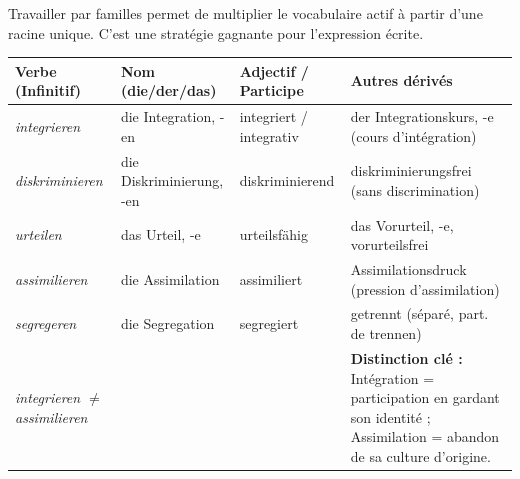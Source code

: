 \documentclass[11pt]{article}
\newcommand{\cle}[1]{{\popxbold\color{popdark}#1}}
\newcommand{\all}[1]{\ifmmode\text{\textit{#1}}\else\begingroup\selectlanguage{ngerman}\itshape #1\endgroup\fi}
\begin{document}
Travailler par familles permet de multiplier le vocabulaire actif à partir d'une racine unique. C'est une stratégie gagnante pour l'expression écrite.

\begin{center}
\begin{tabularx}{\linewidth}{|X|X|X|X|}
\hline
\rowcolor{popgoldL}
\textbf{Verbe (Infinitif)} & \textbf{Nom (die/der/das)} & \textbf{Adjectif / Participe} & \textbf{Autres dérivés} \\
\hline
\all{integrieren} & \cle{die Integration, -en} & \cle{integriert} / \cle{integrativ} & \cle{der Integrationskurs, -e} (cours d'intégration) \\
\all{diskriminieren} & \cle{die Diskriminierung, -en} & \cle{diskriminierend} & \cle{diskriminierungsfrei} (sans discrimination) \\
\all{urteilen} & \cle{das Urteil, -e} & \cle{urteilsfähig} & \cle{das Vorurteil, -e}, \cle{vorurteilsfrei} \\
\all{assimilieren} & \cle{die Assimilation} & \cle{assimiliert} & \cle{Assimilationsdruck} (pression d'assimilation) \\
\all{segregeren} & \cle{die Segregation} & \cle{segregiert} & \cle{getrennt} (séparé, part. de \cle{trennen}) \\
\all{integrieren} $\neq$ \all{assimilieren} & & & \textbf{Distinction clé :} Intégration = participation en gardant son identité ; Assimilation = abandon de sa culture d'origine. \\
\hline
\end{tabularx}
\end{center}
\end{document}
